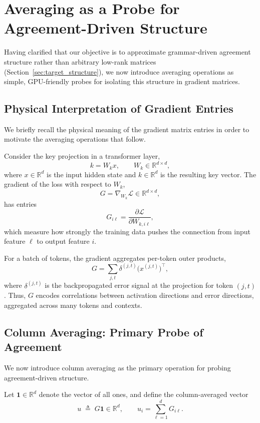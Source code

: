 \section{Averaging as a Probe for Agreement-Driven Structure}
\label{sec:averaging_probe}

Having clarified that our objective is to approximate grammar-driven agreement
structure rather than arbitrary low-rank matrices
(Section~\ref{sec:target_structure}),
we now introduce averaging operations as simple, GPU-friendly probes for isolating
this structure in gradient matrices.

\subsection{Physical Interpretation of Gradient Entries}
\label{sec:physical_gradient}

We briefly recall the physical meaning of the gradient matrix entries in order to
motivate the averaging operations that follow.

Consider the key projection in a transformer layer,
\[
k = W_k x,
\qquad
W_k \in \mathbb{R}^{d\times d},
\]
where $x \in \mathbb{R}^{d}$ is the input hidden state and $k \in \mathbb{R}^{d}$ is
the resulting key vector.
The gradient of the loss with respect to $W_k$,
\[
G = \nabla_{W_k} \mathcal{L} \in \mathbb{R}^{d\times d},
\]
has entries
\[
G_{i\ell} = \frac{\partial \mathcal{L}}{\partial W_{k,i\ell}},
\]
which measure how strongly the training data pushes the connection from input
feature $\ell$ to output feature $i$.

For a batch of tokens, the gradient aggregates per-token outer products,
\[
G = \sum_{j,t} \delta^{(j,t)} \bigl(x^{(j,t)}\bigr)^\top,
\]
where $\delta^{(j,t)}$ is the backpropagated error signal at the projection for
token $(j,t)$.
Thus, $G$ encodes correlations between activation directions and error directions,
aggregated across many tokens and contexts.

\subsection{Column Averaging: Primary Probe of Agreement}
\label{sec:column_averaging}

We now introduce column averaging as the primary operation for probing
agreement-driven structure.

Let $\mathbf{1} \in \mathbb{R}^{d}$ denote the vector of all ones, and define the
column-averaged vector
\[
u \;\triangleq\; G \mathbf{1} \in \mathbb{R}^{d},
\qquad
u_i = \sum_{\ell=1}^{d} G_{i\ell}.
\]

